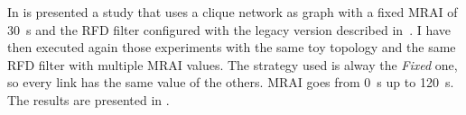 %	

%
%	
%
%
%

In  is presented a study that uses a clique
network as graph with a fixed \ac{MRAI} of \SI{30}{\second} and the \ac{RFD}
filter configured with the legacy version described in~\cite{rfc2439}.
I have then executed again those experiments with the same toy topology and the
same \ac{RFD} filter with multiple \ac{MRAI} values.
The strategy used is alway the \textit{Fixed} one, so every link has the same
value of the others.
\ac{MRAI} goes from \SI{0}{\second} up to \SI{120}{\second}.
The results are presented in .

